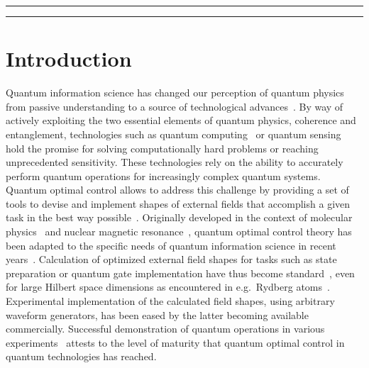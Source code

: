 \documentclass[submission, Phys]{SciPost}
\begin{document}
\vspace{10pt}
\noindent\rule{\textwidth}{1pt}
\tableofcontents\thispagestyle{fancy}
\noindent\rule{\textwidth}{1pt}
\vspace{10pt}


\section{Introduction}%
\label{sec:intro}

Quantum information science has changed our perception of quantum physics from
passive understanding to a source of technological advances~\cite{AcinNJP18}.
By way of actively exploiting the two essential elements of quantum physics,
coherence and entanglement, technologies such as quantum
computing~\cite{NielsenChuang} or quantum sensing~\cite{DegenRMP17} hold the
promise for solving computationally hard problems or reaching unprecedented
sensitivity.
These technologies rely on the ability to accurately perform quantum operations
for increasingly complex quantum systems.
Quantum optimal control allows to address this challenge by providing a set of
tools to devise and implement shapes of external fields that accomplish a given
task in the best way possible~\cite{GlaserEPJD2015}.
Originally developed in the context of molecular
physics~\cite{Tannor92,GrossJCP92} and nuclear magnetic
resonance~\cite{MurdochJMR87,GlaserCPL89}, quantum optimal control theory has
been adapted to the specific needs of quantum information science in recent
years~\cite{GlaserEPJD2015,KochJPCM16}.
Calculation of optimized external field shapes for tasks such as state
preparation or quantum gate implementation have thus become
standard~\cite{GlaserEPJD2015}, even for large Hilbert space dimensions as
encountered in e.g.\ Rydberg atoms~\cite{CuiQST17,PatschPRA18}.
Experimental implementation of the calculated field shapes, using arbitrary
waveform generators, has been eased by the latter becoming available
commercially.
Successful demonstration of quantum operations in various
experiments~\cite{GlaserEPJD2015,LovecchioPRA16,vanFrankSciRep16,OfekNat16,SorensenNat16,HeeresNatComm17,HeckPNAS18,FengPRA18,OmranS2019,Larrouy}
attests to the level of maturity that quantum optimal control in quantum
technologies has reached.
\end{document}
